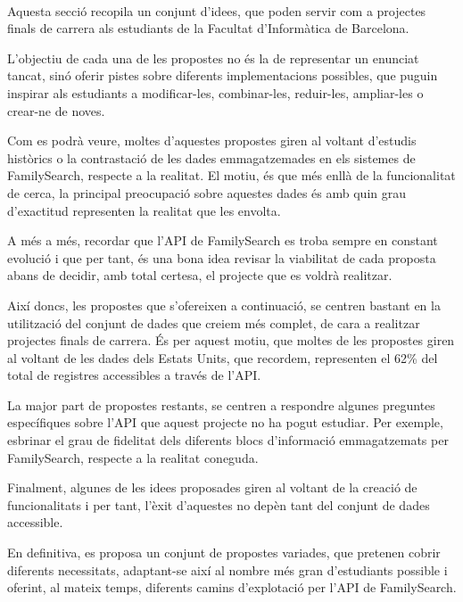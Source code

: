 
    \paragraph{}
    Aquesta secció recopila un conjunt d'idees, que poden servir com a projectes finals de carrera als estudiants de la Facultat d'Informàtica de Barcelona.

    L'objectiu de cada una de les propostes no és la de representar un enunciat tancat, sinó oferir pistes sobre diferents implementacions possibles, que puguin inspirar als estudiants a modificar-les, combinar-les, reduir-les, ampliar-les o crear-ne de noves.

    Com es podrà veure, moltes d'aquestes propostes giren al voltant d'estudis histò\-rics o la contrastació de les dades emmagatzemades en els sistemes de FamilySearch, res\-pec\-te a la realitat. El motiu, és que més enllà de la funcionalitat de cerca, la prin\-ci\-pal preocupació sobre aquestes dades és amb quin grau d'exactitud representen la realitat que les envolta.

    A més a més, recordar que l'API de FamilySearch es troba sempre en constant evolució i que per tant, és una bona idea revisar la viabilitat de cada proposta abans de decidir, amb total certesa, el projecte que es voldrà realitzar.

    Així doncs, les propostes que s’ofereixen a continuació, se centren bastant en la utilització del conjunt de dades que creiem més complet, de cara a realitzar projectes finals de carrera. És per aquest motiu, que moltes de les propostes giren al voltant de les dades dels Estats Units, que recordem, representen el 62\% del total de registres accessibles a través de l’API.

    La major part de propostes restants, se centren a respondre algunes preguntes específiques sobre l’API que aquest projecte no ha pogut estudiar. Per exemple, esbrinar el grau de fidelitat dels diferents blocs d’informació emmagatzemats per FamilySearch, respecte a la realitat coneguda.

    Finalment, algunes de les idees proposades giren al voltant de la creació de funcionalitats i per tant, l’èxit d’aquestes no depèn tant del conjunt de dades accessible.

    En definitiva, es proposa un conjunt de propostes variades, que pretenen cobrir diferents necessitats, adaptant-se així al nombre més gran d'estudiants possible i oferint, al mateix temps, diferents camins d'explotació per l'API de FamilySearch.

